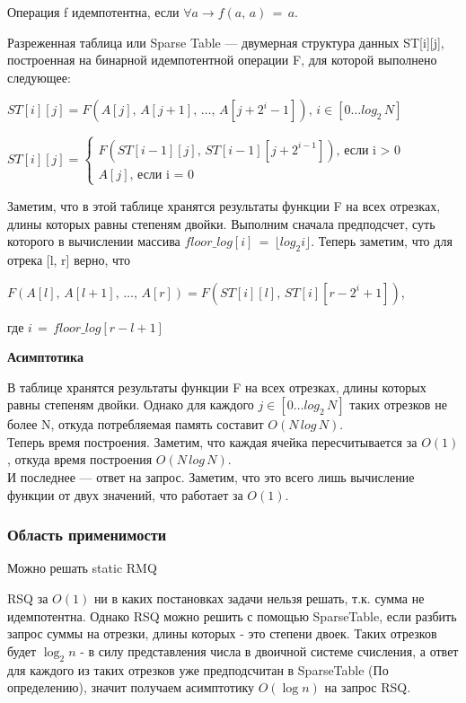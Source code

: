 \Def Операция f идемпотентна, если $\forall a \rightarrow f(a,\,a)\,=\,a$.

\Def Разреженная таблица или Sparse Table — двумерная структура
данных ST[i][j], построенная на бинарной идемпотентной операции F, для которой выполнено следующее:

\begin{center}
$ST[i][j] = F(A[j],\,A[j + 1],\,\dots,\,A[j + 2^i - 1]),\,i \in [0 \dots log_2\,N]$
\end{center}

$ST[i][j] =
\begin{cases}
F(ST[i-1][j],\,ST[i-1][j+2^{i-1}])\text{, если i > 0}\\
A[j]\text{, если i = 0}
\end{cases}$

Заметим, что в этой таблице хранятся результаты функции F на всех отрезках, длины которых равны степеням двойки.
Выполним сначала предподсчет, суть которого в вычислении массива $floor\_log[i]\,=\,\lfloor log_2 i \rfloor$. Теперь заметим, что для отрека [l, r] верно, что

{\centering $F(A[l],\,A[l + 1],\,\dots,\,A[r]) = F(ST[i][l],\,ST[i][r - 2^i + 1])$,\par}
где $i\,=\,floor\_log [r - l + 1]$


\textbf{Асимптотика}

В таблице хранятся результаты функции F на всех отрезках, длины
которых равны степеням двойки. Однако для каждого $j \in [0 \dots log_2\,N]$
таких отрезков не более N, откуда потребляемая память составит
$O(N\,log\,N)$.\\
Теперь время построения. Заметим, что каждая ячейка
пересчитывается за $O(1)$, откуда время построения $O(N\,log\,N)$.\\
И последнее — ответ на запрос. Заметим, что это всего лишь
вычисление функции от двух значений, что работает за $O(1)$.

\subsubsection*{Область применимости}

Можно решать static RMQ


RSQ за $O(1)$ ни в каких постановках задачи нельзя решать, т.к. сумма не идемпотентна. Однако RSQ можно решить с помощью SparseTable, если разбить запрос суммы на отрезки, длины которых - это степени двоек. Таких отрезков будет $\log_2{n}$ - в силу представления числа в двоичной системе счисления, а ответ для каждого из таких отрезков уже предподсчитан в SparseTable (По определению), значит получаем асимптотику $O(\log n)$ на запрос RSQ.   

\pagebreak